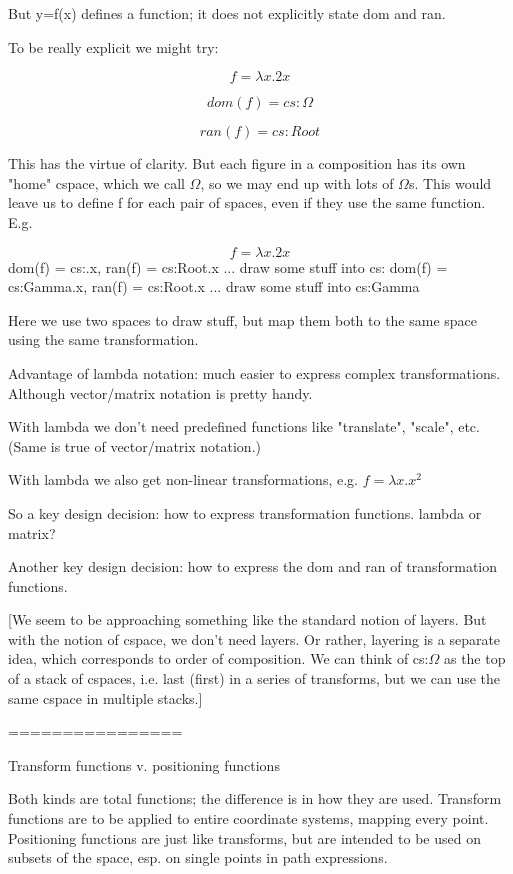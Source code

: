 \documentclass[12pt]{tufte-handout}
\numberwithin{equation}{subsection}
\numberwithin{equation}{subsection}
\begin{document}
  But y=f(x) defines a function; it does not explicitly state dom and ran.

  To be really explicit we might try:

  $$f = \lambda x.2x$$

  $$dom(f) = cs:\Omega$$

  $$ran(f) = cs:Root$$

  This has the virtue of clarity.  But each figure in a composition has
  its own "home" cspace, which we call $\Omega$, so we may end up with lots
  of $\Omega$s.  This would leave us to define f for each pair of spaces,
  even if they use the same function.  E.g.


  $$f = \lambda x.2x$$
  dom(f) = cs:\Omega.x, ran(f) = cs:Root.x
  ... draw some stuff into cs:\Omega
  dom(f) = cs:Gamma.x, ran(f) = cs:Root.x
  ... draw some stuff into cs:Gamma

  Here we use two spaces to draw stuff, but map them both to the same
  space using the same transformation.

  Advantage of lambda notation: much easier to express complex
  transformations.  Although vector/matrix notation is pretty handy.

  With lambda we don't need predefined functions like "translate",
  "scale", etc.  (Same is true of vector/matrix notation.)

  With lambda we also get non-linear transformations, e.g.
  \(f = \lambda x.x^2\)

  So a key design decision: how to express transformation functions.
  lambda or matrix?

  Another key design decision: how to express the dom and ran of
  transformation functions.

  [We seem to be approaching something like the standard notion of
    layers.  But with the notion of cspace, we don't need layers.  Or
    rather, layering is a separate idea, which corresponds to order of
    composition.  We can think of cs:$\Omega$ as the top of a stack of
    cspaces, i.e. last (first) in a series of transforms, but we can use
    the same cspace in multiple stacks.]

  ================

  Transform functions v. positioning functions

  Both kinds are total functions; the difference is in how they are
  used.  Transform functions are to be applied to entire coordinate
  systems, mapping every point.  Positioning functions are just like
  transforms, but are intended to be used on subsets of the space,
  esp. on single points in path expressions.
\end{document}
